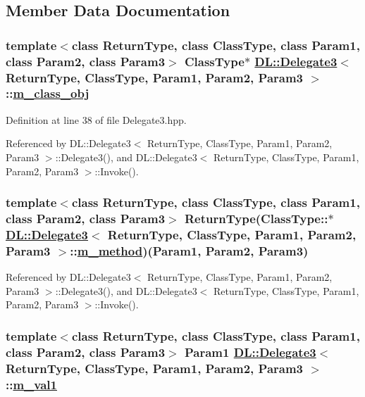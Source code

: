 \subsection{Member Data Documentation}
\hypertarget{classDL_1_1Delegate3_r0}{
\subsubsection[m\_\-class\_\-obj]{\setlength{\rightskip}{0pt plus 5cm}template$<$class Return\-Type, class Class\-Type, class Param1, class Param2, class Param3$>$ Class\-Type$\ast$ \hyperlink{classDL_1_1Delegate3}{DL::Delegate3}$<$ Return\-Type, Class\-Type, Param1, Param2, Param3 $>$::\hyperlink{classDL_1_1Delegate3_r0}{m\_\-class\_\-obj}}}
\label{classDL_1_1Delegate3_r0}




Definition at line 38 of file Delegate3.hpp.

Referenced by DL::Delegate3$<$ Return\-Type, Class\-Type, Param1, Param2, Param3 $>$::Delegate3(), and DL::Delegate3$<$ Return\-Type, Class\-Type, Param1, Param2, Param3 $>$::Invoke().\hypertarget{classDL_1_1Delegate3_r1}{
\subsubsection[m\_\-method]{\setlength{\rightskip}{0pt plus 5cm}template$<$class Return\-Type, class Class\-Type, class Param1, class Param2, class Param3$>$ Return\-Type(Class\-Type::$\ast$ \hyperlink{classDL_1_1Delegate3}{DL::Delegate3}$<$ Return\-Type, Class\-Type, Param1, Param2, Param3 $>$::\hyperlink{classDL_1_1Delegate3_r1}{m\_\-method})(Param1, Param2, Param3)}}
\label{classDL_1_1Delegate3_r1}




Referenced by DL::Delegate3$<$ Return\-Type, Class\-Type, Param1, Param2, Param3 $>$::Delegate3(), and DL::Delegate3$<$ Return\-Type, Class\-Type, Param1, Param2, Param3 $>$::Invoke().\hypertarget{classDL_1_1Delegate3_r2}{
\subsubsection[m\_\-val1]{\setlength{\rightskip}{0pt plus 5cm}template$<$class Return\-Type, class Class\-Type, class Param1, class Param2, class Param3$>$ Param1 \hyperlink{classDL_1_1Delegate3}{DL::Delegate3}$<$ Return\-Type, Class\-Type, Param1, Param2, Param3 $>$::\hyperlink{classDL_1_1Delegate3_r2}{m\_\-val1}}}
\label{classDL_1_1Delegate3_r2}




